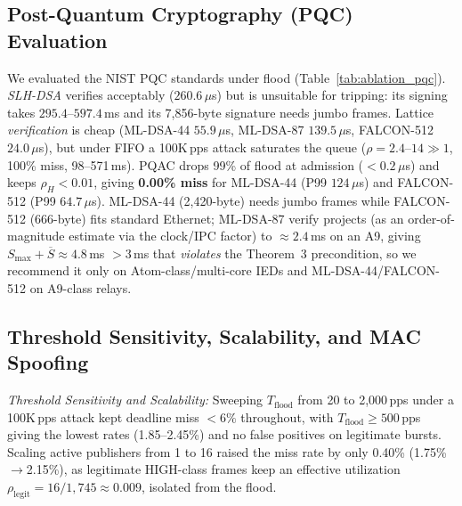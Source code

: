 \documentclass[journal]{IEEEtran}
\begin{document}
\subsection{Post-Quantum Cryptography (PQC) Evaluation}
We evaluated the NIST PQC standards under flood (Table~\ref{tab:ablation_pqc}). \emph{SLH-DSA} verifies acceptably ($260.6\,\mu$s) but is unsuitable for tripping: its signing takes $295.4$--$597.4$\,ms and its 7{,}856-byte signature needs jumbo frames. Lattice \emph{verification} is cheap (ML-DSA-44 $55.9\,\mu$s, ML-DSA-87 $139.5\,\mu$s, FALCON-512 $24.0\,\mu$s), but under FIFO a 100K\,pps attack saturates the queue ($\rho=2.4$--$14\gg 1$, 100\% miss, 98--571\,ms). PQAC drops 99\% of flood at admission ($<0.2\,\mu$s) and keeps $\rho_H<0.01$, giving \textbf{0.00\% miss} for ML-DSA-44 (P99 $124\,\mu$s) and FALCON-512 (P99 $64.7\,\mu$s). ML-DSA-44 (2{,}420-byte) needs jumbo frames while FALCON-512 (666-byte) fits standard Ethernet; ML-DSA-87 verify projects (as an order-of-magnitude estimate via the clock/IPC factor) to $\approx 2.4$\,ms on an A9, giving $S_{\max}+\overline{S}\approx 4.8$\,ms $>3$\,ms that \emph{violates} the Theorem~3 precondition, so we recommend it only on Atom-class/multi-core IEDs and ML-DSA-44/FALCON-512 on A9-class relays.

\subsection{Threshold Sensitivity, Scalability, and MAC Spoofing}
\label{sec:spoof_eval}
\textit{Threshold Sensitivity and Scalability:} Sweeping $T_{\text{flood}}$ from 20 to 2{,}000\,pps under a 100K\,pps attack kept deadline miss $<6\%$ throughout, with $T_{\text{flood}}\ge 500$\,pps giving the lowest rates (1.85--2.45\%) and no false positives on legitimate bursts. Scaling active publishers from 1 to 16 raised the miss rate by only 0.40\% (1.75\%$\to$2.15\%), as legitimate HIGH-class frames keep an effective utilization $\rho_{\text{legit}}=16/1{,}745\approx 0.009$, isolated from the flood.
\end{document}
